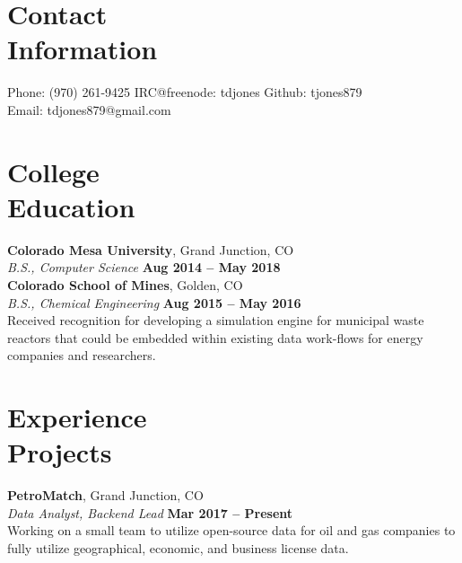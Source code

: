 \documentclass[margin,line]{resume}
\begin{document}
\begin{resume}
    \section{\mysidestyle Contact\\Information}

    Phone: (970) 261-9425 \hfill IRC@freenode: tdjones \hfill Github: tjones879 \\
    \noindent Email: tdjones879@gmail.com  \hfill \vspace{0mm}\\\vspace{-4.5mm}

    \section{\mysidestyle College\\Education}

    \textbf{Colorado Mesa University}, Grand Junction, CO \vspace{2mm}\\\vspace{1mm}%
    \textsl{B.S., Computer Science} \hfill \textbf{Aug 2014 -- May 2018}\\
    
    \textbf{Colorado School of Mines}, Golden, CO \vspace{2mm}\\\vspace{1mm}%
    \textsl{B.S., Chemical Engineering} \hfill \textbf{Aug 2015 -- May 2016}\\
    Received recognition for developing a simulation engine for municipal waste
    reactors that could be embedded within existing data work-flows for energy
    companies and researchers.

    \section{\mysidestyle Experience\\Projects}

    \textbf{PetroMatch}, Grand Junction, CO \vspace{2mm}\\\vspace{1mm}%
    \textsl{Data Analyst, Backend Lead} \hfill \textbf{Mar 2017 -- Present}\\
    Working on a small team to utilize open-source data for oil and gas companies
    to fully utilize geographical, economic, and business license data.


\end{resume}
\end{document}
